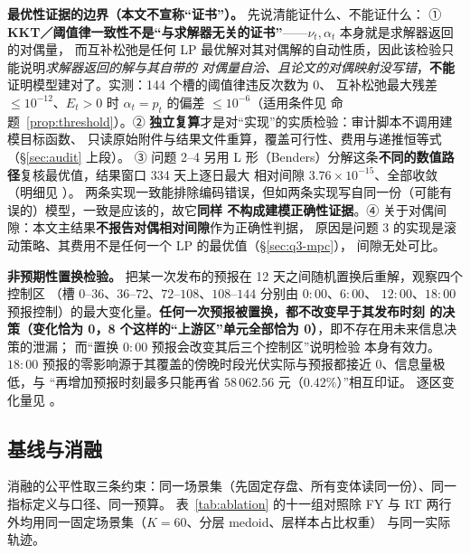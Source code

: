 \textbf{最优性证据的边界（本文不宣称“证书”）。} 先说清能证什么、不能证什么：
① \textbf{KKT／阈值律一致性不是“与求解器无关的证书”}——\(\nu_t,\alpha_t\) 本身就是求解器返回的对偶量，
而互补松弛是任何 LP 最优解对其对偶解的自动性质，因此该检验只能说明\emph{求解器返回的解与其自带的
对偶量自洽、且论文的对偶映射没写错}，\textbf{不能}证明模型建对了。实测：144 个槽的阈值律违反次数为 0、
互补松弛最大残差 \(\le10^{-12}\)、\(E_t>0\) 时 \(\alpha_t=p_t\) 的偏差 \(\le10^{-6}\)（适用条件见
命题~\ref{prop:threshold}）。② \textbf{独立复算}才是对“实现”的实质检验：审计脚本不调用建模目标函数、
只读原始附件与结果文件重算，覆盖可行性、费用与递推恒等式（\S\ref{sec:audit} 上段）。
③ 问题 2--4 另用 L 形（Benders）分解这条\textbf{不同的数值路径}复核最优值，结果窗口 334 天上逐日最大
相对间隙 \(3.76\times10^{-15}\)、全部收敛（明细见 ）。
两条实现一致能排除编码错误，但如两条实现写自同一份（可能有误的）模型，一致是应该的，故它\textbf{同样
不构成建模正确性证据}。④ 关于对偶间隙：本文主结果\textbf{不报告对偶相对间隙}作为正确性判据，
原因是问题 3 的实现是滚动策略、其费用不是任何一个 LP 的最优值（\S\ref{sec:q3-mpc}），
间隙无处可比。

\textbf{非预期性置换检验。} 把某一次发布的预报在 12 天之间随机置换后重解，观察四个控制区
（槽 \(0\)--\(36\)、\(36\)--\(72\)、\(72\)--\(108\)、\(108\)--\(144\) 分别由 \(0{:}00\)、\(6{:}00\)、
\(12{:}00\)、\(18{:}00\) 预报控制）的最大变化量。\textbf{任何一次预报被置换，都不改变早于其发布时刻
的决策（变化恰为 0，8 个这样的“上游区”单元全部恰为 0）}，即不存在用未来信息决策的泄漏；
而“置换 \(0{:}00\) 预报会改变其后三个控制区”说明检验
本身有效力。\(18{:}00\) 预报的零影响源于其覆盖的傍晚时段光伏实际与预报都接近 0、信息量极低，与
“再增加预报时刻最多只能再省 \(58\,062.56\) 元（\(0.42\%\)）”相互印证。
逐区变化量见 。

\subsection{基线与消融}\label{sec:ablation}

消融的公平性取三条约束：同一场景集（先固定存盘、所有变体读同一份）、同一指标定义与口径、同一预算。
表~\ref{tab:ablation} 的十一组对照除 FY 与 RT 两行外均用同一固定场景集（\(K=60\)、分层 medoid、层样本占比权重）
与同一实际轨迹。


